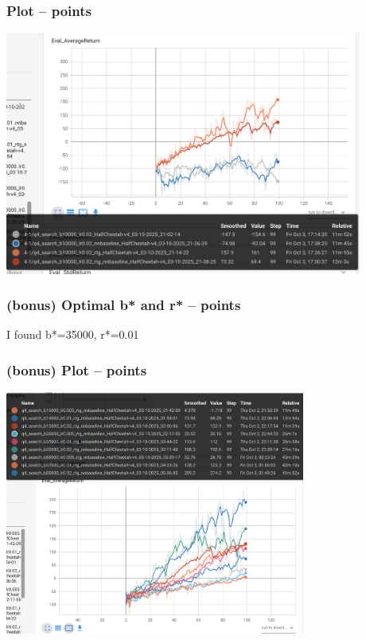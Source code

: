 \documentclass{article}
\begin{document}
\subsubsection{Plot --  points\rbrack}
\begin{answer}[title=Q7.2.2,height=10cm,width=\linewidth]
\centering
\includegraphics[height=8cm]{q4_1.png}
\end{answer}

\subsubsection{(bonus) Optimal b* and r* --  points\rbrack}
\begin{answer}[title=Q7.2.3,height=4cm,width=\linewidth]
I found b*=35000, r*=0.01
\end{answer}

\subsubsection{(bonus) Plot --  points\rbrack}
\begin{answer}[title=Q7.2.4,height=10cm,width=\linewidth]
\centering
\includegraphics[height=8cm]{q4_2.png}
\end{answer}
\end{document}
